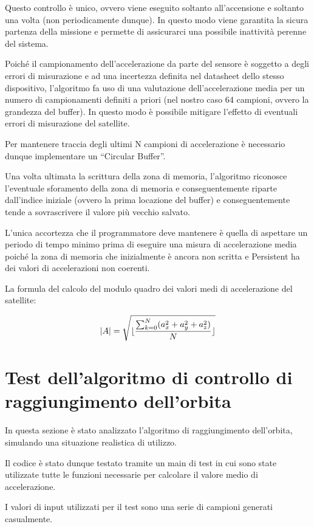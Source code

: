 \documentclass[LaM,binding=0.6cm]{../sapthesis}
\DeclarePairedDelimiter\floor{\lfloor}{\rfloor}
\begin{document}
Questo controllo è unico, ovvero viene eseguito soltanto all’accensione e soltanto una volta (non periodicamente dunque). In questo modo viene garantita la sicura partenza della missione e permette di assicurarci una possibile inattività perenne del sistema.

Poiché il campionamento dell’accelerazione da parte del sensore è soggetto a degli errori di misurazione e ad una incertezza definita nel datasheet dello stesso dispositivo, l’algoritmo fa uso di una valutazione dell’accelerazione media per un numero di campionamenti definiti a priori (nel nostro caso 64 campioni, ovvero la grandezza del buffer).
In questo modo è possibile mitigare l’effetto di eventuali errori di misurazione del satellite.

Per mantenere traccia degli ultimi N campioni di accelerazione è necessario dunque implementare un “Circular Buffer”.

Una volta ultimata la scrittura della zona di memoria, l’algoritmo riconosce l’eventuale sforamento della zona di memoria e conseguentemente riparte dall’indice iniziale (ovvero la prima locazione del buffer) e conseguentemente tende a sovrascrivere il valore più vecchio salvato.

L’unica accortezza che il programmatore deve mantenere è quella di aspettare un periodo di tempo minimo prima di eseguire una misura di accelerazione media poiché la zona di memoria che inizialmente è ancora non scritta e Persistent ha dei valori di accelerazioni non coerenti.

La formula del calcolo del modulo quadro dei valori medi di accelerazione del satellite:

\begin{equation}
    |A| = \sqrt{\floor{\frac{\sum_{k=0}^N (a_x^2+a_y^2+a_z^2) }{N} } }
\end{equation}

\section{Test dell'algoritmo di controllo di raggiungimento dell'orbita}

In questa sezione è stato analizzato l'algoritmo di raggiungimento dell'orbita, simulando una situazione realistica di utilizzo.

Il codice è stato dunque testato tramite un main di test in cui sono state utilizzate tutte le funzioni necessarie per calcolare il valore medio di accelerazione.

I valori di input utilizzati per il test sono una serie di campioni generati casualmente.
\end{document}
